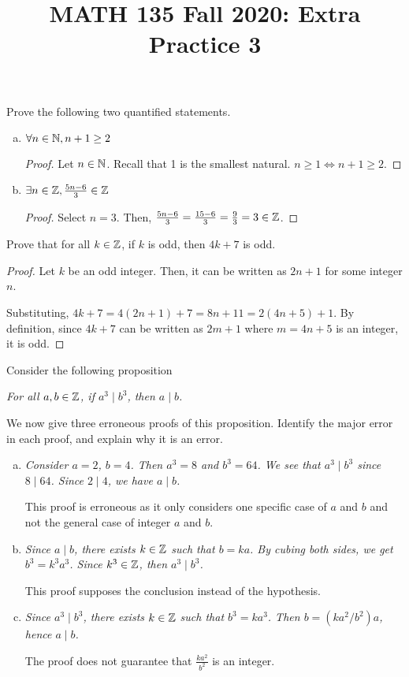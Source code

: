 
\title{MATH 135 Fall 2020: Extra Practice 3}


\thispagestyle{firstpage}

\textbf{\@title}


\question Prove the following two quantified statements.
\begin{enumerate}[(a)]
  \item $\forall n \in \mathbb{N}, n+1 \geq 2$
        \begin{proof}
          Let $n \in \mathbb{N}$.
          Recall that 1 is the smallest natural.
          $n \geq 1 \iff n+1 \geq 2$.
        \end{proof}

  \item $\exists n \in \mathbb{Z}, \frac{5n-6}{3} \in \mathbb{Z}$
        \begin{proof}
          Select $n=3$. Then, $\frac{5n-6}{3}=\frac{15-6}{3}=\frac{9}{3}=3 \in \mathbb{Z}$.
        \end{proof}
\end{enumerate}


\question Prove that for all $k \in \mathbb{Z}$, if $k$ is odd, then $4k + 7$ is odd.
\begin{proof}
  Let $k$ be an odd integer.
  Then, it can be written as $2n+1$ for some integer $n$.

  Substituting, $4k+7 = 4(2n+1) + 7 = 8n+11 =2(4n+5)+1$.
  By definition, since $4k+7$ can be written as $2m+1$ where $m=4n+5$ is an integer, it is odd.
\end{proof}


\question Consider the following proposition
\begin{center}
  \emph{For all $a,b\in\mathbb{Z}$, if $a^3 \mid b^3$, then $a \mid b$.}
\end{center}
We now give three erroneous proofs of this proposition. Identify the major error in each proof, and explain why it is an error.
\begin{enumerate}[(a)]
  \item \emph{Consider $a = 2$, $b = 4$. Then $a^3 = 8$ and $b^3 = 64$. We see that $a^3 \mid b^3$ since $8 \mid 64$. Since $2 \mid 4$, we have $a \mid b$.}

        This proof is erroneous as it only considers one specific case of $a$ and $b$ and not the general case of integer $a$ and $b$.

  \item \emph{Since $a \mid b$, there exists $k\in\mathbb{Z}$ such that $b=ka$. By cubing both sides, we get $b^3 = k^3a^3$. Since $k^3\in\mathbb{Z}$, then $a^3\mid b^3$.}

        This proof supposes the conclusion instead of the hypothesis.

  \item \emph{Since $a^3 \mid b^3$, there exists $k\in\mathbb{Z}$ such that $b^3=ka^3$. Then $b=(ka^2/b^2)a$, hence $a \mid b$.}

        The proof does not guarantee that $\frac{ka^2}{b^2}$ is an integer.
\end{enumerate}


